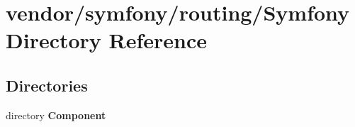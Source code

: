 \section{vendor/symfony/routing/\+Symfony Directory Reference}
\label{dir_6939bf3359fb4123ce9e49e4ae89b1f6}
\subsection*{Directories}
\begin{DoxyCompactItemize}
\item 
directory {\bf Component}
\end{DoxyCompactItemize}
